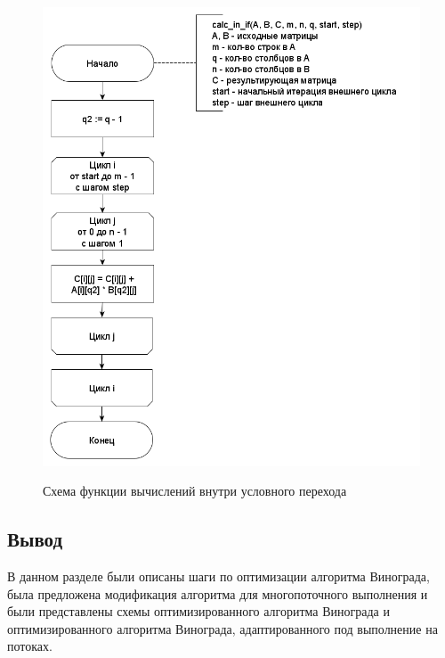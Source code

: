 \documentclass[a4paper,14pt]{article}
\begin{document}
	    
	    	    \begin{figure}[h!]
	    	\begin{center}
	    		{\includegraphics[scale = 0.5]{if_cycle.png}}
	    		\caption{Схема функции вычислений внутри условного перехода}
	    		\label{fig:schema_in_if}
	    	\end{center}
	    \end{figure}
	    
	\newpage
	\mbox{}
	\newpage
	\mbox{}
	\newpage
	\mbox{}
	\newpage
	\mbox{}
	\newpage
	    
	    
	\subsection*{Вывод}
		В данном разделе были описаны шаги по оптимизации алгоритма Винограда, была предложена модификация алгоритма для многопоточного выполнения и были представлены схемы оптимизированного алгоритма Винограда и оптимизированного алгоритма Винограда, адаптированного под выполнение на потоках.
\end{document}
